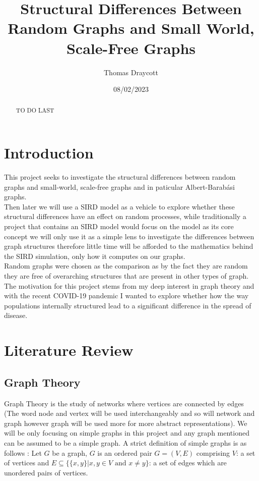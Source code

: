 \documentclass{article}
\title{Structural Differences Between Random Graphs and Small World, Scale-Free Graphs }
\date{08/02/2023}
\author{Thomas Draycott}
\begin{document}
    \maketitle
    \newpage
    \begin{abstract}
        TO DO LAST
    \end{abstract}
    \tableofcontents
    \newpage
    \section{Introduction}
    This project seeks to investigate the structural differences between random graphs and small-world, scale-free graphs and in paticular Albert-Barabási graphs.\\
    Then later we will use a SIRD model as a vehicle to explore whether these structural differences have an effect on random processes,  while traditionally a project that contains an SIRD model would focus on the model as its core concept we will only use it as a simple lens to investigate the differences between graph structures therefore little time will be afforded to the mathematics behind the SIRD simulation, only how it computes on our graphs.\\
    Random graphs were chosen as the comparison as by the fact they are random they are free of overarching structures that are present in other types of graph.\\
    The motivation for this project stems from my deep interest in graph theory and with the recent COVID-19 pandemic I wanted to explore whether how the way populations internally structured lead to a significant difference in the spread of disease.
    \section{Literature Review}
        \subsection{Graph Theory}
        Graph Theory is the study of networks where vertices are connected by edges (The word node and vertex will be used interchangeably and so will network and graph however graph will be used more for more abstract representations). We will be only focusing on simple graphs in this project and any graph mentioned can be assumed to be a simple graph. A strict definition of simple graphs is as follows \parencite{bender2010lists}: Let $G$ be a graph, $G$ is an ordered pair $G=(V,E)$ comprising $V$: a set of vertices and $E\subseteq \{\{x,y\} | x,y \in V \text{ and } x\neq y\}$: a set of edges which are unordered pairs of vertices.
\end{document}
